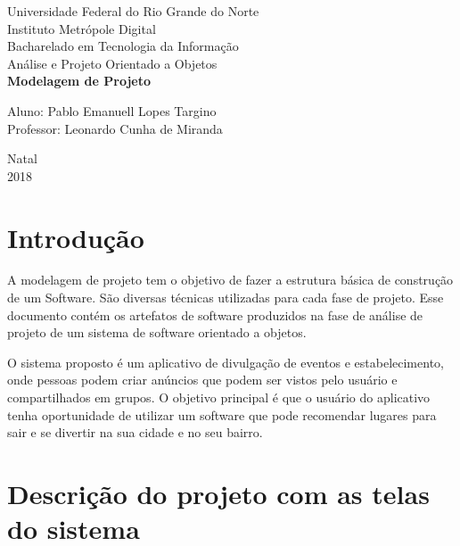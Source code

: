 \documentclass{article}
\begin{document}
\begin{titlepage} %
\begin{center} %
{\large Universidade Federal do Rio Grande do Norte }\\[0.2cm] %
{\large Instituto Metrópole Digital}\\[0.2cm] %
{\large Bacharelado em Tecnologia da Informação}\\[0.2cm]
{\large Análise e Projeto Orientado a Objetos}\\[5.1cm]
{\bf \huge Modelagem de Projeto}\\[5.1cm] %
\end{center} %
{\large Aluno: Pablo Emanuell Lopes Targino}\\[0.7cm] %
{\large Professor: Leonardo Cunha de Miranda}\\[5.1cm]
\begin{center}
{\large Natal}\\[0.2cm]
{\large 2018}
\end{center}
\end{titlepage} 
\section{Introdução}

A modelagem de projeto tem o objetivo de fazer a estrutura básica de construção de um Software. São diversas técnicas utilizadas para cada fase de projeto. Esse documento contém os artefatos de software produzidos na fase de análise de projeto de um sistema de software orientado a objetos.

O sistema proposto é um aplicativo de divulgação de eventos e estabelecimento, onde pessoas podem criar anúncios que podem ser vistos pelo usuário e compartilhados em grupos. O objetivo principal é que o usuário do aplicativo tenha oportunidade de utilizar um software que pode recomendar lugares para sair e se divertir na sua cidade e no seu bairro.

\section{Descrição do projeto com as telas do sistema} 
\end{document}
